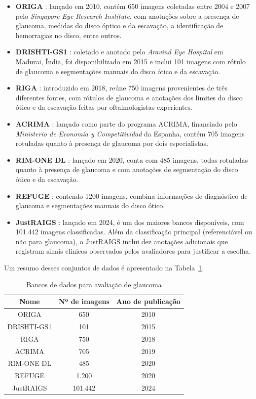 \documentclass[12pt]{article}
\begin{document}
\begin{itemize}
    \item \textbf{ORIGA} \cite{origa}: lançado em 2010, contém 650 imagens coletadas entre 2004 e 2007 pelo \textit{Singapore Eye Research Institute}, com anotações sobre a presença de glaucoma, medidas do disco óptico e da escavação, a identificação de hemorragias no disco, entre outros.
    \item \textbf{DRISHTI-GS1} \cite{drishti_1} \cite{drishti_2}: coletado e anotado pelo \textit{Aravind Eye Hospital} em Madurai, Índia, foi disponibilizado em 2015 e inclui 101 imagens com rótulo de glaucoma e segmentações manuais do disco ótico e da escavação.
    \item \textbf{RIGA} \cite{riga}: introduzido em 2018, reúne 750 imagens provenientes de três diferentes fontes, com rótulos de glaucoma e anotações dos limites do disco ótico e da escavação feitas por oftalmologistas experientes.
    \item \textbf{ACRIMA} \cite{diaz-pinto2019cnns}: lançado como parte do programa ACRIMA, financiado pelo \textit{Ministerio de Economía y Competitividad} da Espanha, contém 705 imagens rotuladas quanto à presença de glaucoma por dois especialistas.
    \item \textbf{RIM-ONE DL} \cite{rim-one-dl}: lançado em 2020, conta com 485 imagens, todas rotuladas quanto à presença de glaucoma e com anotações de segmentação do disco ótico e da escavação.
    \item \textbf{REFUGE} \cite{refuge}: contendo 1200 imagens, combina informações de diagnóstico de glaucoma e segmentações manuais do disco ótico.
    \item \textbf{JustRAIGS} \cite{justraigs}: lançado em 2024, é um dos maiores bancos disponíveis, com 101.442 imagens classificadas. Além da classificação principal (referenciável ou não para glaucoma), o JustRAIGS inclui dez anotações adicionais que registram sinais clínicos observados pelos avaliadores para justificar a escolha.
\end{itemize}

Um resumo desses conjuntos de dados é apresentado na Tabela~\ref{tab:datasets}.


\begin{table}[htb]
    \centering
    \begin{tabular}{|c|c|c|}
    \hline
    Nome & Nº de imagens & Ano de publicação \\
    \hline
    ORIGA & 650 & 2010 \\
    \hline
    DRISHTI-GS1 & 101 & 2015 \\
    \hline
    RIGA & 750 & 2018 \\
    \hline
    ACRIMA & 705 & 2019 \\
    \hline
    RIM-ONE DL & 485 & 2020 \\
    \hline
    REFUGE & 1.200 & 2020 \\
    \hline
    JustRAIGS & 101.442 & 2024 \\
    \hline
    \end{tabular}
    \caption{Bancos de dados para avaliação de glaucoma}
    \label{tab:datasets}
\end{table}
\end{document}
